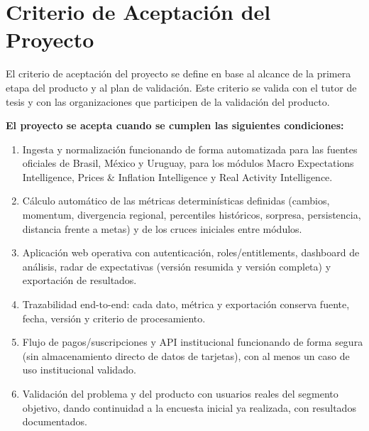 \documentclass[11pt,a4paper]{article}
\begin{document}
\section{Criterio de Aceptaci\'on del Proyecto}

El criterio de aceptaci\'on del proyecto se define en base al alcance de la primera etapa del producto y al plan de validaci\'on. Este criterio se valida con el tutor de tesis y con las organizaciones que participen de la validaci\'on del producto.

\textbf{El proyecto se acepta cuando se cumplen las siguientes condiciones:}

\begin{enumerate}
  \item Ingesta y normalizaci\'on funcionando de forma automatizada para las fuentes oficiales de Brasil, M\'exico y Uruguay, para los m\'odulos Macro Expectations Intelligence, Prices \& Inflation Intelligence y Real Activity Intelligence.
  \item C\'alculo autom\'atico de las m\'etricas determin\'isticas definidas (cambios, momentum, divergencia regional, percentiles hist\'oricos, sorpresa, persistencia, distancia frente a metas) y de los cruces iniciales entre m\'odulos.
  \item Aplicaci\'on web operativa con autenticaci\'on, roles/entitlements, dashboard de an\'alisis, radar de expectativas (versi\'on resumida y versi\'on completa) y exportaci\'on de resultados.
  \item Trazabilidad end-to-end: cada dato, m\'etrica y exportaci\'on conserva fuente, fecha, versi\'on y criterio de procesamiento.
  \item Flujo de pagos/suscripciones y API institucional funcionando de forma segura (sin almacenamiento directo de datos de tarjetas), con al menos un caso de uso institucional validado.
  \item Validaci\'on del problema y del producto con usuarios reales del segmento objetivo, dando continuidad a la encuesta inicial ya realizada, con resultados documentados.
\end{enumerate}
\end{document}
